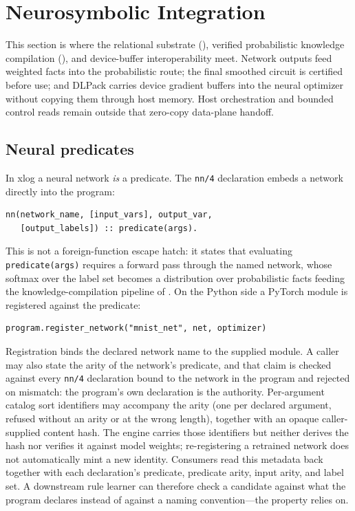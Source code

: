 \section{Neurosymbolic Integration}\label{sec:nesy}

This section is where the relational substrate (), verified probabilistic knowledge compilation (), and device-buffer interoperability meet. Network outputs feed weighted facts into the probabilistic route; the final smoothed circuit is certified before use; and DLPack carries device gradient buffers into the neural optimizer without copying them through host memory. Host orchestration and bounded control reads remain outside that zero-copy data-plane handoff.

\subsection{Neural predicates}\label{subsec:neural-pred}

In xlog a neural network \emph{is} a predicate. The \texttt{nn/4} declaration embeds a network directly into the program:

\begin{lstlisting}[style=xlogstyle,
                   caption={Neural predicate declaration (\texttt{nn/4}).},
                   label={lst:nn-decl}]
nn(network_name, [input_vars], output_var,
   [output_labels]) :: predicate(args).
\end{lstlisting}

This is not a foreign-function escape hatch: it states that evaluating \texttt{predicate(args)} requires a forward pass through the named network, whose softmax over the label set becomes a distribution over probabilistic facts feeding the knowledge-compilation pipeline of . On the Python side a PyTorch module is registered against the predicate:

\begin{lstlisting}[style=pythonstyle,
                   caption={Registering a PyTorch module against a neural predicate.},
                   label={lst:nn-register}]
program.register_network("mnist_net", net, optimizer)
\end{lstlisting}

Registration binds the declared network name to the supplied module. A caller may also state the arity of the network's predicate, and that claim is checked against every \texttt{nn/4} declaration bound to the network in the program and rejected on mismatch: the program's own declaration is the authority. Per-argument catalog sort identifiers may accompany the arity (one per declared argument, refused without an arity or at the wrong length), together with an opaque caller-supplied content hash. The engine carries those identifiers but neither derives the hash nor verifies it against model weights; re-registering a retrained network does not automatically mint a new identity. Consumers read this metadata back together with each declaration's predicate, predicate arity, input arity, and label set. A downstream rule learner can therefore check a candidate against what the program declares instead of against a naming convention---the property  relies on.

